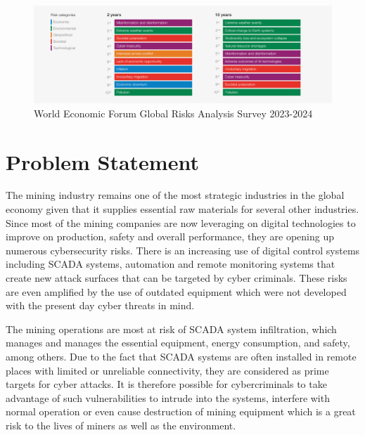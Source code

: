 \documentclass[a4paper,twoside,12pt]{report}
\begin{document}
\begin{figure}[ht]
    \centering
    \includegraphics[width=1.0\linewidth]{images/world-economic-forum-global-risks.png}  %
    \caption{World Economic Forum Global Risks Analysis Survey 2023-2024}
    \label{fig:thing11}
\end{figure}

\section{Problem Statement}

The mining industry remains one of the most strategic industries in the global  economy given that it supplies essential raw materials for several other industries. Since most of the mining companies are  now leveraging on digital technologies to improve on production, safety and overall performance, they are opening up numerous  cybersecurity risks. There is an increasing use of digital control systems including SCADA systems, automation and remote  monitoring systems that create new attack surfaces that can be targeted by cyber criminals. These risks are even amplified  by the use of outdated equipment which were not developed with the present day cyber threats in mind. 
 
The mining operations are most at risk of SCADA system infiltration, which manages and manages the essential  equipment, energy consumption, and safety, among others. Due to the fact that SCADA systems are often  installed in remote places with limited or unreliable connectivity, they are considered as prime targets for cyber attacks.  It is therefore possible for cybercriminals to take advantage of such vulnerabilities to intrude into the  systems, interfere with normal operation or even cause destruction of mining equipment which is a great risk to the lives  of miners as well as the environment. 
 
\end{document}
